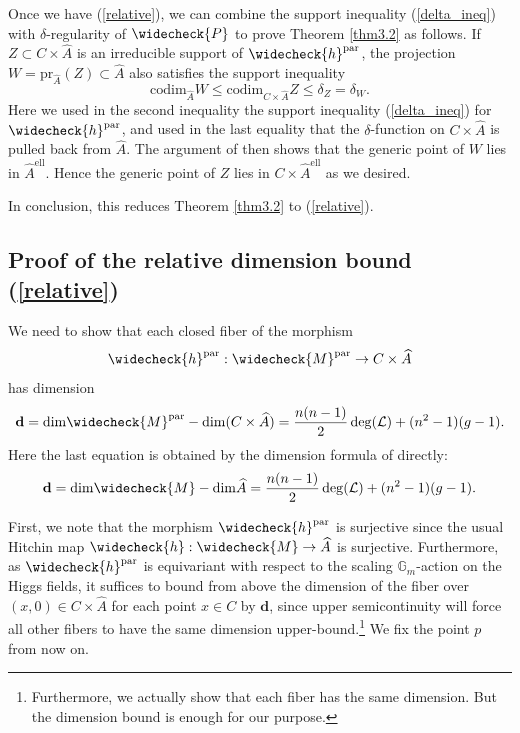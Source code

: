 \documentclass[11pt]{amsart}
\theoremstyle{plain}
\theoremstyle{definition}
\theoremstyle{remark}
\newcommand{\BG}{{\mathbb{G}}}
\newcommand{\CA}{{\mathcal A}}
\newcommand{\CL}{{\mathcal L}}
\newcommand{\CM}{{\mathcal M}}
\begin{document}
Once we have (\ref{relative}),
we can combine the support inequality (\ref{delta_ineq}) with $\delta$-regularity of 
$\widecheck{P}$ \cite[corollary 5.4.4]{dC_SL} to prove 
Theorem \ref{thm3.2} as follows.  If $Z \subset C \times \widehat{A}$ is an irreducible support of $\widecheck{h}^{\mathrm{par}}$, the projection $W = \mathrm{pr}_{\widehat{A}}(Z) \subset \hat{A}$ also satisfies the support inequality
\[
\mathrm{codim}_{\widehat{A}} W \leq \mathrm{codim}_{C\times \widehat{A}}Z \leq \delta_Z = \delta_W.
\]
Here we used in the second inequality the support inequality (\ref{delta_ineq}) for $\widecheck{h}^{\mathrm{par}}$, and used in the last equality that the $\delta$-function on $C\times \widehat{A}$ is pulled back from $\widehat{A}$. The argument of \cite[Section 6.2]{dC_SL} then shows that the generic point of $W$ lies in $\widehat{A}^{\mathrm{ell}}$. Hence the generic point of $Z$ lies in $C\times \widehat{A}^{\mathrm{ell}}$ as we desired.




In conclusion, this reduces Theorem \ref{thm3.2} to (\ref{relative}).



\subsection{Proof of the relative dimension bound (\ref{relative})}\label{sec4.4}

We need to show that each closed fiber of the morphism
$$\widecheck{h}^{\mathrm{par}}: \widecheck{M}^{\mathrm{par}} \rightarrow C\times \widehat{A}$$
has dimension
\[
\mathbf{d} = \mathrm{dim}\widecheck{M}^{\mathrm{par}} - \mathrm{dim} (C\times \widehat{A}) =    \frac{n(n-1)}{2}\deg(\CL) + (n^2-1)(g-1).\]
Here the last equation is obtained by the dimension formula of \cite[Proposition 2.4.6]{dC_SL} directly:
\[
\mathbf{d} =  \mathrm{dim}\widecheck{M} - \mathrm{dim}\widehat{A} = \frac{n(n-1)}{2} \deg(\CL) + (n^2-1)(g-1).
\]



First,  we note that the morphism $\widecheck{h}^{\mathrm{par}}$ is surjective since the usual Hitchin map $\widecheck{h}: \widecheck{M} \to \widehat{A}$ is surjective. Furthermore, as $\widecheck{h}^{\mathrm{par}}$ is equivariant with respect to the scaling $\BG_m$-action on the Higgs fields, it suffices to bound from above the dimension of the fiber over $(x, 0) \in C\times \widehat{A}$ for each point $x \in C$ by $\mathbf{d}$, since upper semicontinuity will force all other fibers to have the same dimension upper-bound.\footnote{Furthermore, we actually show that each fiber has the same dimension. But the dimension bound is enough for our purpose.}  We fix the point $p$ from now on.
\end{document}
